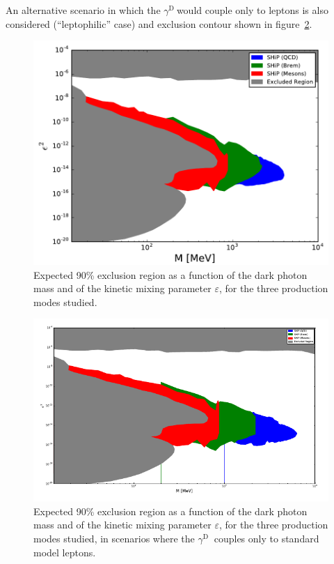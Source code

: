 \documentclass[12pt,a4paper]{article}
\newcommand{\mathDP}{\gamma^{\mathrm{D}}\ }
\newcommand{\DP}{$\mathDP$}
\begin{document}
An alternative scenario in which the \DP would couple only to leptons
is also considered (``leptophilic'' case) and exclusion contour shown
in figure~\ref{fig:sensitivityLep}.

\begin{figure}[h!]
  \centering
\includegraphics[width=1.\textwidth]{figures/sensitivity.png}
\caption{Expected 90\% exclusion region as a function of the dark
  photon mass and of the kinetic mixing parameter $\varepsilon$, for
  the three production modes studied.}
\label{fig:sensitivity}
\end{figure}

\begin{figure}[h!]
  \centering
\includegraphics[width=1.\textwidth]{figures/sensitivityLeptophilic.png}
\caption{Expected 90\% exclusion region as a function of the dark
  photon mass and of the kinetic mixing parameter $\varepsilon$, for
  the three production modes studied, in scenarios where the \DP
  couples only to standard model leptons.}
\label{fig:sensitivityLep}
\end{figure}
\end{document}
